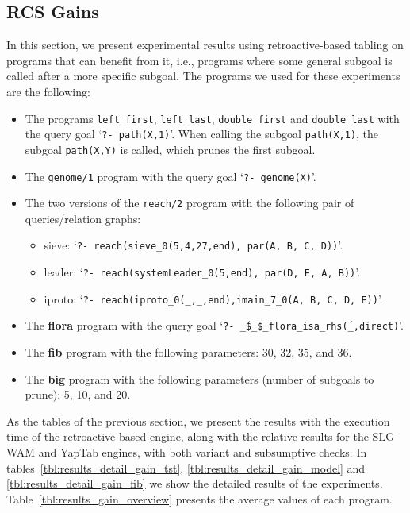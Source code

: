 


\subsection{RCS Gains}

In this section, we present experimental results using retroactive-based tabling on programs that
can benefit from it, i.e., programs where some general subgoal is called after a more specific subgoal.
The programs we used for these experiments are the following:

\begin{itemize}
   \item The programs \texttt{left\_first}, \texttt{left\_last},
   \texttt{double\_first} and \texttt{double\_last} with the query goal `\texttt{?-~path(X,1)}'.
   When calling the subgoal \texttt{path(X,1)}, the subgoal
   \texttt{path(X,Y)} is called, which prunes the first subgoal.
   
   \item The \texttt{genome/1} program with the query goal `\texttt{?-~genome(X)}'.
   
   \item The two versions of the \texttt{reach/2} program with the following pair of queries/relation graphs:

   \begin{itemize}
      \item sieve: `\texttt{?-~reach(sieve\_0(5,4,27,end),~par(A,~B,~C,~D))}'.
      \item leader: `\texttt{?-~reach(systemLeader\_0(5,end),~par(D,~E,~A,~B))}'.
      \item iproto: `\texttt{?-~reach(iproto\_0(\_,\_,end),imain\_7\_0(A,~B,~C,~D,~E))}'.
   \end{itemize}
   
   \item The \textbf{flora} program with the query goal `\texttt{?-~\'\_\$\_\$\_flora\_isa\_rhs\'(\_,direct)}'.
   
   \item The \textbf{fib} program with the following parameters: 30, 32, 35, and 36.
   
   \item The \textbf{big} program with the following parameters (number of subgoals to prune): 5, 10, and 20.
\end{itemize}

As the tables of the previous section, we present the results with the execution time of the retroactive-based
engine, along with the relative results for the SLG-WAM and YapTab engines, with both variant and subsumptive checks.
In tables~\ref{tbl:results_detail_gain_tst}, \ref{tbl:results_detail_gain_model} and \ref{tbl:results_detail_gain_fib}
we show the detailed results of the experiments. Table~\ref{tbl:results_gain_overview} presents the average values of
each program.

